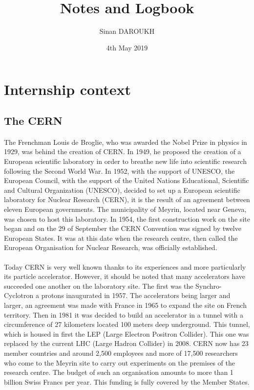 \documentclass[a4paper, 12pt]{article}
\title{Notes and Logbook}
\author{Sinan DAROUKH}
\date{4th May 2019}
\begin{document}
\begin{titlepage}
\maketitle
\end{titlepage}

\tableofcontents
\newpage

\section{Internship context}
\subsection{The CERN}
\paragraph{}
The Frenchman Louis de Broglie, who was awarded the Nobel Prize in physics in 1929, was behind the creation of CERN. 
In 1949, he proposed the creation of a European scientific laboratory in order to breathe new life into scientific research following the Second World War. 
In 1952, with the support of UNESCO, the European Council, with the support of the United Nations Educational, Scientific and Cultural Organization (UNESCO), decided to set up a European scientific laboratory for Nuclear Research (CERN), it is the result of an agreement between eleven European governments. 
The municipality of Meyrin, located near Geneva, was chosen to host this laboratory.
In 1954, the first construction work on the site began and on the 29 of September the CERN Convention was signed by twelve European States. 
It was at this date when the research centre, then called the European Organisation for Nuclear Research, was officially established.
\paragraph{}
Today CERN is very well known thanks to its experiences and more particularly its particle accelerator. 
However, it should be noted that many accelerators have succeeded one another on the laboratory site. 
The first was the Synchro-Cyclotron a protons inaugurated in 1957. The accelerators being larger and larger, an agreement was made with France in 1965 to expand the site on French territory. 
Then in 1981 it was decided to build an accelerator in a tunnel with a circumference of 27 kilometers located 100 meters deep underground. 
This tunnel, which is housed in first the LEP (Large Electron Positron Collider). This one was replaced by the current LHC (Large Hadron Collider) in 2008. 
CERN now has 23 member countries and around 2,500 employees and more of 17,500 researchers who come to the Meyrin site to carry out experiments on the premises of the research centre. 
The budget of such an organisation amounts to more than 1 billion Swiss Francs per year.
This funding is fully covered by the Member States.
\end{document}
